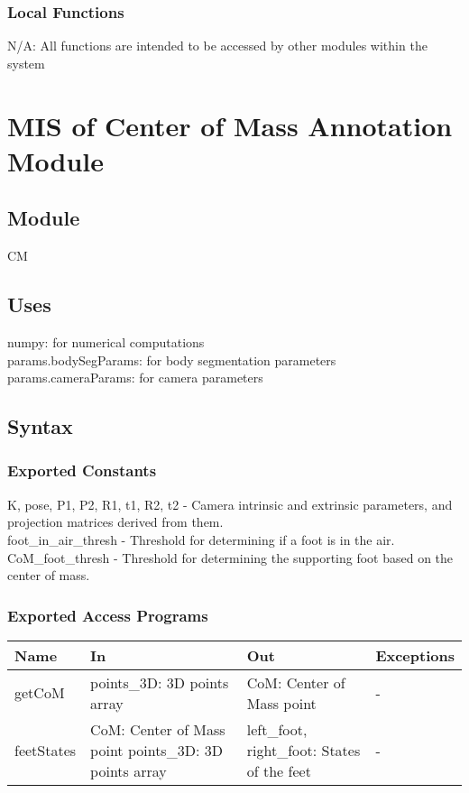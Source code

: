 \documentclass[12pt, titlepage]{article}
\begin{document}
\subsubsection{Local Functions}
N/A: All functions are intended to be accessed by other modules within the system

\section{MIS of Center of Mass Annotation Module}
\label{sec:centerofmass}

\subsection{Module}
CM

\subsection{Uses}
\noindent numpy: for numerical computations\\
\noindent params.bodySegParams: for body segmentation parameters\\
\noindent params.cameraParams: for camera parameters

\subsection{Syntax}

\subsubsection{Exported Constants}
K, pose, P1, P2, R1, t1, R2, t2 - Camera intrinsic and extrinsic parameters, and projection matrices derived from them.\\
foot\_in\_air\_thresh - Threshold for determining if a foot is in the air.\\
CoM\_foot\_thresh - Threshold for determining the supporting foot based on the center of mass.

\subsubsection{Exported Access Programs}

\noindent\begin{tabularx}{\textwidth}{X X X X}
    \toprule
    \textbf{Name} & \textbf{In} & \textbf{Out} & \textbf{Exceptions} \\
    \midrule
    getCoM & points\_3D: 3D points array & CoM: Center of Mass point & - \\
    feetStates & CoM: Center of Mass point points\_3D: 3D points array & left\_foot, right\_foot: States of the feet & - \\
    \bottomrule
\end{tabularx}
\end{document}
